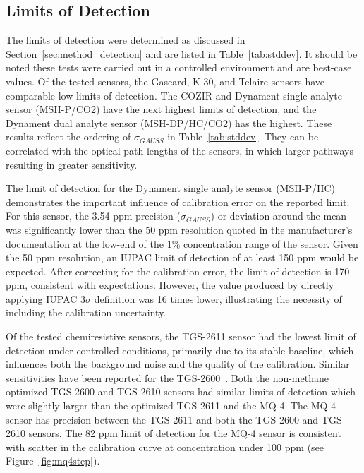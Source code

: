 \documentclass[sensors,article,submit,moreauthors,pdftex]{Definitions/mdpi}
\begin{document}
		\subsection{Limits of Detection}	
	
			The limits of detection were determined as discussed in Section~\ref{sec:method_detection} and are listed in Table~\ref{tab:stddev}.
			It should be noted these tests were carried out in a controlled environment and are best-case values.
			Of the tested  sensors, the Gascard, K-30, and Telaire sensors have comparable low limits of detection.
			The COZIR and Dynament single analyte sensor (MSH-P/CO2) have the next highest limits of detection, and the Dynament dual analyte sensor (MSH-DP/HC/CO2) has the highest.
			These results reflect the ordering of $\sigma_{GAUSS}$ in Table~\ref{tab:stddev}. They can be correlated with the optical path lengths of the sensors, in which larger pathways resulting in greater sensitivity.
			
		
			The limit of detection for the Dynament single analyte  sensor (MSH-P/HC) demonstrates the important influence of calibration error on the reported limit.
			For this sensor, the 3.54 ppm precision ($\sigma_{GAUSS}$) or deviation around the mean was significantly lower than the 50 ppm resolution quoted in the manufacturer's documentation at the low-end of the 1\% concentration range of the sensor.
			Given the 50 ppm resolution, an IUPAC limit of detection of at least 150 ppm would be expected. 
			After correcting for the calibration error, the limit of detection is 170 ppm, consistent with expectations.
			However, the value produced by directly applying IUPAC $3\sigma$ definition was 16 times lower, illustrating the necessity of including the calibration uncertainty.
			
	
			Of the tested chemiresistive  sensors, the TGS-2611 sensor had the lowest limit of detection under controlled conditions, primarily due to its stable baseline, which influences both the background noise and the quality of the calibration.
			Similar sensitivities have been reported for the TGS-2600~\cite{eugster_performance_2012}.
			Both the non-methane optimized TGS-2600 and TGS-2610 sensors had similar limits of detection which were slightly larger than the  optimized TGS-2611 and the MQ-4.
			The MQ-4 sensor has precision between the TGS-2611 and both the TGS-2600 and TGS-2610 sensors.
			The 82 ppm limit of detection for the MQ-4 sensor is consistent with scatter in the calibration curve at concentration under 100 ppm (see Figure~\ref{fig:mq4step}).
			
\end{document}
